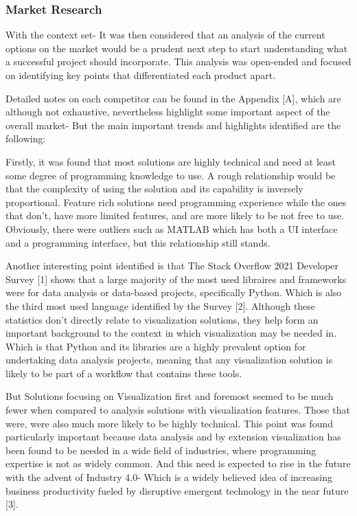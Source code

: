 \subsubsection{Market Research}

With the context set- It was then considered that an analysis of the current options on the market would be a prudent next step to start understanding what a successful project should incorporate. This analysis was open-ended and focused on identifying key points that differentiated each product apart.

Detailed notes on each competitor can be found in the Appendix [A], which are although not exhaustive, nevertheless highlight some important aspect of the overall market- But the main important trends and highlights identified are the following:

Firstly, it was found that most solutions are highly technical and need at least some degree of programming knowledge to use. A rough relationship would be that the complexity of using the solution and its capability is inversely proportional. Feature rich solutions need programming experience while the ones that don’t, have more limited features, and are more likely to be not free to use. Obviously, there were outliers such as MATLAB which has both a UI interface and a programming interface, but this relationship still stands.

Another interesting point identified is that The Stack Overflow 2021 Developer Survey [1] shows that a large majority of the most used libraires and frameworks were for data analysis or data-based projects, specifically Python. Which is also the third most used language identified by the Survey [2]. Although these statistics don’t directly relate to visualization solutions, they help form an important background to the context in which visualization may be needed in. Which is that Python and its libraries are a highly prevalent option for undertaking data analysis projects, meaning that any visualization solution is likely to be part of a workflow that contains these tools.

But Solutions focusing on Visualization first and foremost seemed to be much fewer when compared to analysis solutions with visualization features. Those that were, were also much more likely to be highly technical. This point was found particularly important because data analysis and by extension visualization has been found to be needed in a wide field of industries, where programming expertise is not as widely common. And this need is expected to rise in the future with the advent of Industry 4.0- Which is a widely believed idea of increasing business productivity fueled by disruptive emergent technology in the near future [3].

